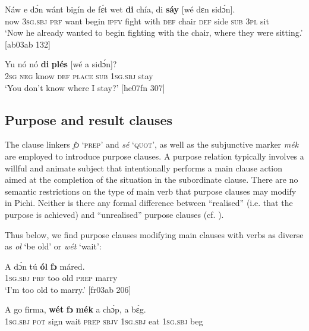 \ea%
    \label{ex:key:1489}
    \gll Náw    e    dɔ́n  wánt  bigín  de  fɛ́t    wet
\textbf{di}  chía,  di  \textbf{sáy}  [wé    dɛn  sidɔ́n]. \\
now    \textsc{3sg.sbj}  \textsc{prf}  want  begin  \textsc{ipfv}  fight  with
\textsc{def}  chair  \textsc{def}  side   \textsc{sub}    \textsc{3pl}  sit\\

\glt ‘Now he already wanted to begin fighting with the chair, 
where they were sitting.’ [ab03ab 132]
\z


\ea%
    \label{ex:key:1490}
    \gll Yu  nó  nó    \textbf{di}  \textbf{plés}    [wé    a    sidɔ́n]?\\
\textsc{2sg}  \textsc{neg}  know  \textsc{def}  \textsc{place}   \textsc{sub}    \textsc{1sg.sbj}  stay\\

\glt ‘You don’t know where I stay?’ [he07fn 307]
\z

\subsection{Purpose and result clauses}\label{sec:10.7.6}

The clause linkers \textit{fɔ} ‘\textsc{prep}’ and \textit{sé} ‘\textsc{quot}’, as well as the subjunctive marker \textit{mék} are employed to introduce purpose clauses. A purpose relation typically involves a willful and animate subject that intentionally performs a main clause action aimed at the completion of the situation in the subordinate clause. There are no semantic restrictions on the type of main verb that purpose clauses may modify in Pichi. Neither is there any formal difference between “realised” (i.e. that the purpose is achieved) and “unrealised” purpose clauses (cf. \citealt[59]{Bickerton1981}).


Thus below, we find purpose clauses modifying main clauses with verbs as diverse as \textit{ol} ‘be old’ or \textit{wét} ‘wait’:



\ea%
    \label{ex:key:1491}
    \gll \MakeUppercase{A}   dɔ́n    tú  \textbf{ól}  \textbf{fɔ} máred.\\
\textsc{1sg.sbj}  \textsc{prf}    too  old  \textsc{prep}  marry\\

\glt ‘I’m too old to marry.’ [fr03ab 206]
\z


\ea%
    \label{ex:key:1492}
    \gll A    go  firma,   \textbf{wét}     \textbf{fɔ}  \textbf{mék}    a    chɔ́p,  a    bɛ́g.\\
\textsc{1sg.sbj}  \textsc{pot}  sign    wait    \textsc{prep}  \textsc{sbjv}    \textsc{1sg.sbj}  eat    \textsc{1sg.sbj}  beg\\

